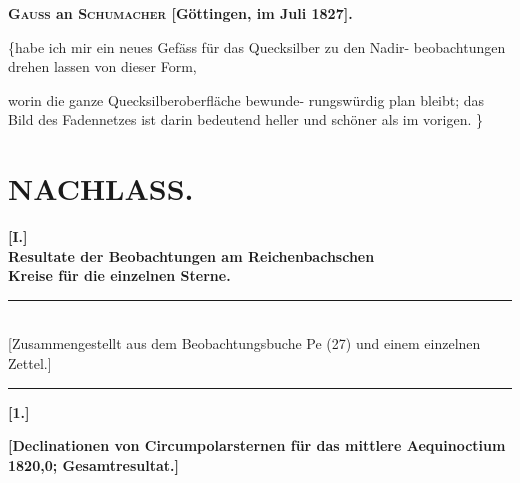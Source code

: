\documentclass[12pt,a4paper]{article}
\theoremstyle{plain}
\theoremstyle{definition}
\theoremstyle{remark}
\begin{document}
\medskip
\textbf{\textsc{Gauss} an \textsc{Schumacher} [G\"{o}ttingen, im Juli 1827].}

\medskip
\{\dotfill habe ich mir ein neues Gef\"{a}ss f\"{u}r das Quecksilber zu den Nadir-
beobachtungen drehen lassen von dieser Form,

\begin{center}
\fbox{\parbox{3cm}{\centering\vspace{0.3cm}\rule{2.5cm}{0.4pt}\\[0.2cm]
\rule{1cm}{0.4pt} \raisebox{-0.3ex}{\rule{0.8cm}{0.8pt}} \rule{1cm}{0.4pt}\\[0.2cm]
\rule{2.5cm}{0.4pt}\vspace{0.3cm}}}
\end{center}

worin die ganze Quecksilberoberfl\"{a}che bewunde-
rungsw\"{u}rdig plan bleibt; das Bild des Fadennetzes
ist darin bedeutend heller und sch\"{o}ner als im
vorigen. \dotfill\}

\newpage
\section*{NACHLASS.}

\begin{center}
\Large\textbf{[I.]}\\[0.5em]
\textbf{Resultate der Beobachtungen am Reichenbachschen}\\
\textbf{Kreise f\"{u}r die einzelnen Sterne.}
\end{center}

\begin{center}
\rule{0.8\textwidth}{0.4pt}\\[0.3em]
{\small [Zusammengestellt aus dem Beobachtungsbuche Pe (27) und einem einzelnen Zettel.]}\\[0.3em]
\rule{0.8\textwidth}{0.4pt}
\end{center}

\medskip
\begin{center}
\textbf{[1.]}
\end{center}

\begin{center}
\textbf{[Declinationen von Circumpolarsternen f\"{u}r das mittlere Aequinoctium 1820,0; Gesamtresultat.]}
\end{center}
\end{document}
